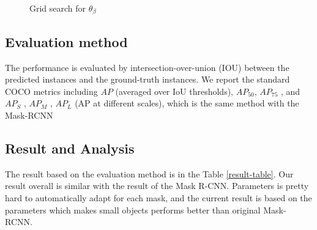 \documentclass{article}
\begin{document}
\begin{figure}
    \centering
    \caption{Grid search for $\theta_{\beta}$}
    \label{grid_search_beta}
\end{figure}

\subsection{Evaluation method}
The performance is evaluated by intersection-over-union (IOU) between the predicted instances and the ground-truth instances. We report the standard COCO metrics including $AP$ (averaged over IoU thresholds), $AP_{50}$, $AP_{75}$ , and $AP_S$ , $AP_M$ , $AP_L$ (AP at different scales), which is the same method with the Mask-RCNN

\subsection{Result and Analysis}
The result based on the evaluation method is in the Table \ref{result-table}. Our result overall is similar with the result of the Mask R-CNN. Parameters is pretty hard to automatically adapt for each mask, and the current result is based on the parameters which makes small objects performs better than original Mask-RCNN. 
\end{document}
